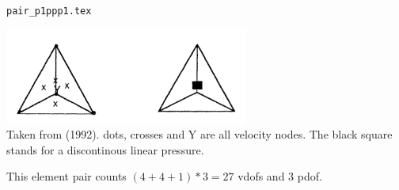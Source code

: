 \begin{flushright} {\tiny {\color{gray} \tt pair\_p1ppp1.tex}} \end{flushright}


\begin{center}
\includegraphics[width=8cm]{images/pair_p1ppp1/p1ppp1}\\
{\captionfont Taken from \textcite{begt92} (1992). 
dots, crosses and Y are all velocity nodes. The black 
square stands for a discontinous linear pressure.}
\end{center}

This element pair counts $(4+4+1)*3=27$ vdofs and 3 pdof.

